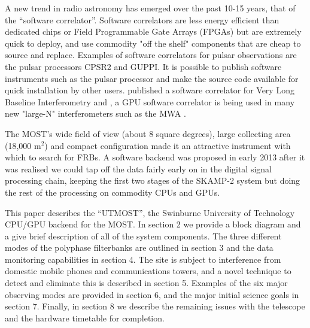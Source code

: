 A new trend in radio astronomy has emerged over the past 10-15 years, that of the ``software correlator''. Software correlators are less energy efficient than dedicated chips or Field Programmable Gate Arrays (FPGAs) but are extremely quick to deploy, and use commodity "off the shelf" components that are cheap to source and replace. Examples of software correlators for pulsar observations are the pulsar processors CPSR2 \cite{Bailes_2009} and GUPPI\cite{DuPlain_2008}. It is possible to publish software instruments such as the pulsar processor  \cite{van_Straten_2011} and make the source code available for quick installation by other users. \cite{Deller_2007} published  a software correlator for Very Long Baseline Interferometry and  \cite{Clark_2012}, a GPU software correlator is being used in many new "large-N" interferometers such as the MWA \cite{Tingay_2013}. 

The MOST's wide field of view (about 8 square degrees), large collecting area (18,000 m$^2$) and compact configuration made it an attractive instrument with which to search for FRBs. A software backend was proposed in early 2013 after it was realised we could tap off the data fairly early on in the digital signal processing chain, keeping the first two stages of the SKAMP-2 system but doing the rest of the processing on commodity CPUs and GPUs. 

This paper describes the ``UTMOST'', the Swinburne University of Technology CPU/GPU backend for the MOST. In section 2 we provide a block diagram and a give brief description of all of the system components. The three different modes of the polyphase filterbanks are outlined in section 3 and the data monitoring capabilities in section 4. The site is subject to interference from domestic mobile phones and communications towers, and a novel technique to detect and eliminate this is described in section 5. Examples of the six major observing modes are provided in section 6, and the major initial science goals in section 7. Finally, in section 8 we describe the remaining issues with the telescope and the hardware timetable for completion.



